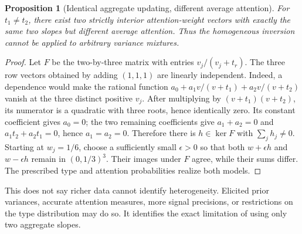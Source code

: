 \documentclass[11pt]{article}
\newtheorem{proposition}[theorem]{Proposition}
\theoremstyle{definition}
\begin{document}
\begin{proposition}[Identical aggregate updating, different average attention]
For $t_1\ne t_2$, there exist two strictly interior attention-weight vectors with exactly the same two slopes but different average attention. Thus the homogeneous inversion cannot be applied to arbitrary variance mixtures.
\end{proposition}
\begin{proof}
Let $F$ be the two-by-three matrix with entries $v_j/(v_j+t_r)$. The three row vectors obtained by adding $(1,1,1)$ are linearly independent. Indeed, a dependence would make the rational function
$a_0+a_1v/(v+t_1)+a_2v/(v+t_2)$ vanish at the three distinct positive $v_j$. After multiplying by $(v+t_1)(v+t_2)$, its numerator is a quadratic with three roots, hence identically zero. Its constant coefficient gives $a_0=0$; the two remaining coefficients give $a_1+a_2=0$ and $a_1t_2+a_2t_1=0$, hence $a_1=a_2=0$.
Therefore there is $h\in\ker F$ with $\sum_jh_j\ne0$. Starting at $w_j=1/6$, choose a sufficiently small $\epsilon>0$ so that both $w+\epsilon h$ and $w-\epsilon h$ remain in $(0,1/3)^3$. Their images under $F$ agree, while their sums differ. The prescribed type and attention probabilities realize both models.
\end{proof}
This does not say richer data cannot identify heterogeneity. Elicited prior variances, accurate attention measures, more signal precisions, or restrictions on the type distribution may do so. It identifies the exact limitation of using only two aggregate slopes.
\end{document}
